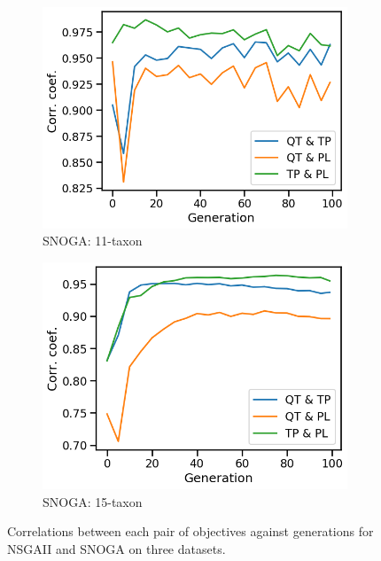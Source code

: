 \begin{figure}[!htbp]
\begin{subfigure}[b]{0.3\textwidth}
			\includegraphics[width=\textwidth]{Figure/11-taxon_NOSSGA_corr_plot}
			\caption{SNOGA: 11-taxon}
		\end{subfigure}%
		\begin{subfigure}[b]{0.3\textwidth}
			\includegraphics[width=\textwidth]{Figure/15-taxon_NOSSGA_corr_plot}
			\caption{SNOGA: 15-taxon}
		\end{subfigure}
		\caption{Correlations between each pair of objectives against generations for NSGAII and SNOGA on three datasets.}
		\label{fig:gen_wise_correlation}
\end{figure}

